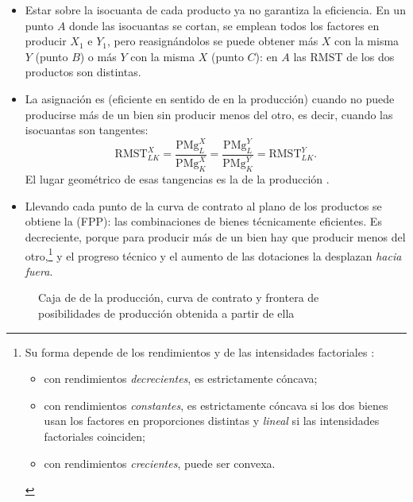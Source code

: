 \documentclass[11pt]{article}
\begin{document}
\begin{itemize}
\item Estar sobre la isocuanta de cada producto ya no garantiza la eficiencia. En un punto $A$ donde las isocuantas se cortan, se emplean todos los factores en producir $X_1$ e $Y_1$, pero reasignándolos se puede obtener más $X$ con la misma $Y$ (punto $B$) o más $Y$ con la misma $X$ (punto $C$): en $A$ las RMST de los dos productos son distintas.
\item La asignación es  (eficiente en sentido de  en la producción) cuando no puede producirse más de un bien sin producir menos del otro, es decir, cuando las isocuantas son tangentes:
  \begin{equation}
  \mathrm{RMST}^X_{LK}=\frac{\mathrm{PMg}^X_L}{\mathrm{PMg}^X_K}=\frac{\mathrm{PMg}^Y_L}{\mathrm{PMg}^Y_K}=\mathrm{RMST}^Y_{LK}. \label{eq:eficiencia-produccion}
  \end{equation}
  El lugar geométrico de esas tangencias es la  de la producción .
\item Llevando cada punto de la curva de contrato al plano de los productos se obtiene la  (FPP): las combinaciones de bienes técnicamente eficientes. Es decreciente, porque para producir más de un bien hay que producir menos del otro,\footnote{Su forma depende de los rendimientos y de las intensidades factoriales  :
\begin{itemize}
\item con rendimientos \emph{decrecientes}, es estrictamente cóncava;
\item con rendimientos \emph{constantes}, es estrictamente cóncava si los dos bienes usan los factores en proporciones distintas y \emph{lineal} si las intensidades factoriales coinciden;
\item con rendimientos \emph{crecientes}, puede ser convexa.
\end{itemize}} y el progreso técnico y el aumento de las dotaciones la desplazan \emph{hacia fuera}.
\end{itemize}

\begin{figure}[H]
\centering
\caption{Caja de  de la producción, curva de contrato y frontera de posibilidades de producción obtenida a partir de ella}\label{fig:caja-edgeworth-fpp}
\end{figure}
\end{document}
